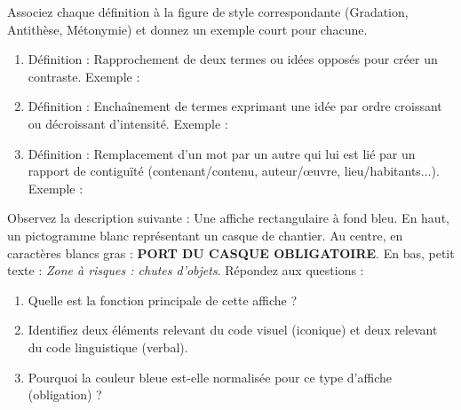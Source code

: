 \documentclass[11pt]{article}
\begin{document}
\begin{exercice}
Associez chaque définition à la figure de style correspondante (Gradation, Antithèse, Métonymie) et donnez un exemple court pour chacune.
\begin{enumerate}
    \item Définition : Rapprochement de deux termes ou idées opposés pour créer un contraste. \dotfill
    \quad Exemple : \dotfill
    \item Définition : Enchaînement de termes exprimant une idée par ordre croissant ou décroissant d'intensité. \dotfill
    \quad Exemple : \dotfill
    \item Définition : Remplacement d'un mot par un autre qui lui est lié par un rapport de contiguïté (contenant/contenu, auteur/œuvre, lieu/habitants...). \dotfill
    \quad Exemple : \dotfill
\end{enumerate}
\end{exercice}

\begin{exercice}
Observez la description suivante : \og Une affiche rectangulaire à fond bleu. En haut, un pictogramme blanc représentant un casque de chantier. Au centre, en caractères blancs gras : \textbf{PORT DU CASQUE OBLIGATOIRE}. En bas, petit texte : \textit{Zone à risques : chutes d'objets}\fg.
Répondez aux questions :
\begin{enumerate}
    \item Quelle est la fonction principale de cette affiche ? \dotfill
    \item Identifiez deux éléments relevant du code visuel (iconique) et deux relevant du code linguistique (verbal). \dotfill
    \item Pourquoi la couleur bleue est-elle normalisée pour ce type d'affiche (obligation) ? \dotfill
\end{enumerate}
\end{exercice}
\end{document}
